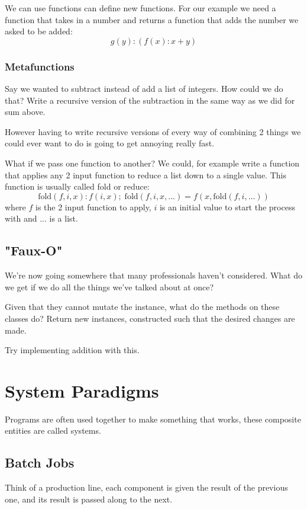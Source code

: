 \documentclass{article}
\begin{document}
We can use functions can define new functions.
For our example we need a function that takes in a number and returns a
function that adds the number we asked to be added:
\begin{displaymath}
g(y): (f(x): x + y)
\end{displaymath}

\subsubsection{Metafunctions}
Say we wanted to subtract instead of add a list of integers.
How could we do that?
Write a recursive version of the subtraction in the same way as we did for sum
above.

However having to write recursive versions of every way of combining 2 things
we could ever want to do is going to get annoying really fast.

What if we pass one function to another?
We could, for example write a function that applies any 2 input function to
reduce a list down to a single value.
This function is usually called fold or reduce:
\begin{displaymath}
\mathrm{fold}(f, i, x): f(i, x) ;\; \mathrm{fold}(f, i, x, ...) = f(x, \mathrm{fold}(f, i, ...))
\end{displaymath}
where $f$ is the 2 input function to apply, $i$ is an initial value to start
the process with and $...$ is a list.

\subsection{"Faux-O"}
We're now going somewhere that many professionals haven't considered.
What do we get if we do all the things we've talked about at once?

Given that they cannot mutate the instance, what do the methods on these
classes do?
Return new instances, constructed such that the desired changes are made.

Try implementing addition with this.

\section{System Paradigms}
Programs are often used together to make something that works, these composite
entities are called systems.

\subsection{Batch Jobs}
Think of a production line, each component is given the result of the previous
one, and its result is passed along to the next.
\end{document}
